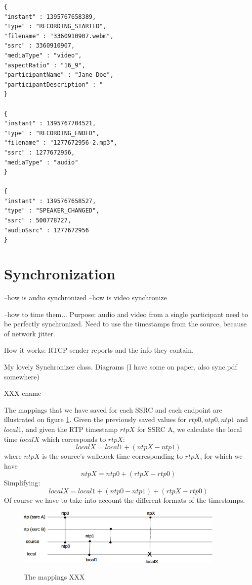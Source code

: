 \documentclass[twoside,openright,a4paper,12pt,english]{article}
\begin{document}
\begin{verbatim}
{
"instant" : 1395767658389,
"type" : "RECORDING_STARTED",
"filename" : "3360910907.webm",
"ssrc" : 3360910907,
"mediaType" : "video",
"aspectRatio" : "16_9",
"participantName" : "Jane Doe",
"participantDescription" : "
}

{
"instant" : 1395767704521,
"type" : "RECORDING_ENDED",
"filename" : "1277672956-2.mp3",
"ssrc" : 1277672956,
"mediaType" : "audio"
}

{
"instant" : 1395767658527,
"type" : "SPEAKER_CHANGED",
"ssrc" : 500778727,
"audioSsrc" : 1277672956
}
\end{verbatim}

\section{Synchronization}
--how is audio synchronized
--how is video synchronize

--how to time them...
Purpose: audio and video from a single participant need to be perfectly synchronized. Need to use the timestamps from the source, because of network jitter. 

How it works: RTCP sender reports and the info they contain.

My lovely Synchronizer class. Diagrams (I have some on paper, also sync.pdf somewhere)

XXX cname


The mappings that we have saved for each SSRC and each endpoint are illustrated
on figure \ref{diagram-sync}. Given the previously saved values for $rtp0,
ntp0, ntp1$ and $local1$, and given the RTP timestamp $rtpX$ for SSRC A, we calculate the local
time $localX$ which corresponds to $rtpX$:
$$localX = local1 + (ntpX - ntp1)$$ 
where $ntpX$ is the source's wallclock time corresponding to $rtpX$, for which we have
$$ntpX = ntp0 + (rtpX - rtp0)$$
Simplifying: $$localX = local1 + (ntp0 - ntp1) + (rtpX - rtp0)$$
Of course we have to take into account the different formats of the timestamps.

\begin{figure}[h]
    \includegraphics[width=0.9\textwidth]{./pics/diagram-sync.eps}
    \label{diagram-sync}
    \caption{The mappings XXX}
\end{figure}
\end{document}
